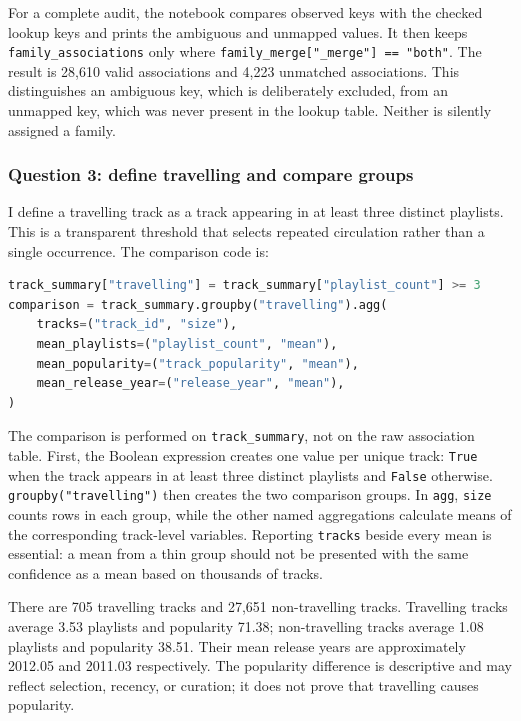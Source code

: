 \documentclass[11pt,a4paper]{article}
\begin{document}
For a complete audit, the notebook compares observed keys with the checked lookup keys and prints the ambiguous and unmapped values. It then keeps \texttt{family\_associations} only where \texttt{family\_merge["\_merge"] == "both"}. The result is 28,610 valid associations and 4,223 unmatched associations. This distinguishes an ambiguous key, which is deliberately excluded, from an unmapped key, which was never present in the lookup table. Neither is silently assigned a family.

\subsubsection{Question 3: define travelling and compare groups}
I define a travelling track as a track appearing in at least three distinct playlists. This is a transparent threshold that selects repeated circulation rather than a single occurrence. The comparison code is:

\begin{lstlisting}[language=python]
track_summary["travelling"] = track_summary["playlist_count"] >= 3
comparison = track_summary.groupby("travelling").agg(
    tracks=("track_id", "size"),
    mean_playlists=("playlist_count", "mean"),
    mean_popularity=("track_popularity", "mean"),
    mean_release_year=("release_year", "mean"),
)
\end{lstlisting}

The comparison is performed on \texttt{track\_summary}, not on the raw association table. First, the Boolean expression creates one value per unique track: \texttt{True} when the track appears in at least three distinct playlists and \texttt{False} otherwise. \texttt{groupby("travelling")} then creates the two comparison groups. In \texttt{agg}, \texttt{size} counts rows in each group, while the other named aggregations calculate means of the corresponding track-level variables. Reporting \texttt{tracks} beside every mean is essential: a mean from a thin group should not be presented with the same confidence as a mean based on thousands of tracks.

There are 705 travelling tracks and 27,651 non-travelling tracks. Travelling tracks average 3.53 playlists and popularity 71.38; non-travelling tracks average 1.08 playlists and popularity 38.51. Their mean release years are approximately 2012.05 and 2011.03 respectively. The popularity difference is descriptive and may reflect selection, recency, or curation; it does not prove that travelling causes popularity.
\end{document}

